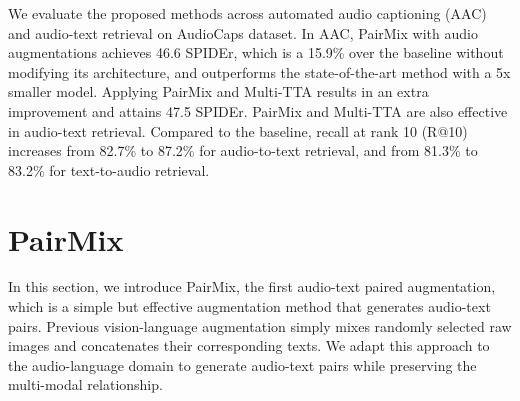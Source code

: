 \documentclass{INTERSPEECH2023}
\begin{document}
We evaluate the proposed methods across automated audio captioning (AAC) and audio-text retrieval on AudioCaps dataset. In AAC, PairMix with audio augmentations achieves 46.6 SPIDEr, which is a 15.9\% over the baseline without modifying its architecture, and outperforms the state-of-the-art method with a 5x smaller model. Applying PairMix and Multi-TTA results in an extra improvement and attains 47.5 SPIDEr. PairMix and Multi-TTA are also effective in audio-text retrieval. Compared to the baseline, recall at rank 10 (R@10) increases from 82.7\% to 87.2\% for audio-to-text retrieval, and from 81.3\% to 83.2\% for text-to-audio retrieval.

\section{PairMix}
\label{sec:format}

In this section, we introduce PairMix, the first audio-text paired augmentation, which is a simple but effective augmentation method that generates audio-text pairs. Previous vision-language augmentation \cite{hao2023mixgen} simply mixes randomly selected raw images and concatenates their corresponding texts. We adapt this approach to the audio-language domain to generate audio-text pairs while preserving the multi-modal relationship.
\end{document}
